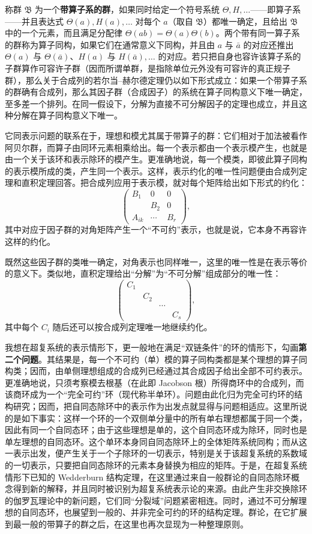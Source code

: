 \documentclass[11pt]{article}
\newcommand{\srcemph}[1]{\textbf{#1}}
\begin{document}
称群 $\mathfrak{B}$ 为一个\srcemph{带算子系的群}，如果同时给定一个符号系统 $\Theta,H,\ldots$——即算子系——并且表达式 $\Theta(a),H(a),\ldots$ 对每个 $a$（取自 $\mathfrak{B}$）都唯一确定，且给出 $\mathfrak{B}$ 中的一个元素，而且满足分配律 $\Theta(ab)=\Theta(a)\Theta(b)$。两个带有同一算子系的群称为算子同构，如果它们在通常意义下同构，并且由 $a$ 与 $\bar a$ 的对应还推出 $\Theta(a)$ 与 $\Theta(\bar a)$、$H(a)$ 与 $H(\bar a),\ldots$ 的对应。若只把自身也容许该算子系的子群算作可容许子群（因而所谓单群，是指除单位元外没有可容许的真正规子群），那么关于合成列的若尔当--赫尔德定理仍以如下形式成立：如果一个带算子系的群确有合成列，那么其因子群（合成因子）的系统在算子同构意义下唯一确定，至多差一个排列。在同一假设下，分解为直接不可分解因子的定理也成立，并且这种分解在算子同构意义下唯一。

它同表示问题的联系在于，理想和模尤其属于带算子的群：它们相对于加法被看作阿贝尔群，而算子由同环元素相乘给出。每一个表示都由一个表示模产生，也就是由一个关于该环和表示除环的模产生。更准确地说，每一个模类，即彼此算子同构的表示模所成的类，产生同一个表示。这样，表示约化的唯一性问题便由合成列定理和直积定理回答。把合成列应用于表示模，就对每个矩阵给出如下形式的约化：
\[
\begin{pmatrix}
B_1&0&0\\
&B_2&0\\
A_{ik}&\cdots&B_r
\end{pmatrix},
\]
其中对应于因子群的对角矩阵产生一个“不可约”表示，也就是说，它本身不再容许这样的约化。

既然这些因子群的类唯一确定，对角表示也同样唯一，这里的唯一性是在表示等价的意义下。类似地，直积定理给出“分解”为“不可分解”组成部分的唯一性：
\[
\begin{pmatrix}
C_1&&&\\
&C_2&&\\
&&\cdots&\\
&&&C_s
\end{pmatrix},
\]
其中每个 $C_i$ 随后还可以按合成列定理唯一地继续约化。

我想在超复系统的表示情形下，更一般地在满足“双链条件”的环的情形下，勾画\srcemph{第二个问题}。其结果是，每一个不可约（单）模的算子同构类都是某个理想的算子同构类；因而，由单侧理想组成的合成列已经通过其合成因子给出全部不可约表示。更准确地说，只须考察模去根基（在此即 Jacobson 根）所得商环中的合成列，而该商环成为一个“完全可约”环（现代称半单环）。问题由此化归为完全可约环的结构研究；因而，把自同态除环中的表示作为出发点就显得与问题相适应。这里所说的是如下事实：这样一个环的一个双侧单分量中的所有单右理想都属于同一个类，因此有同一个自同态环；由于这些理想是单的，这个自同态环成为除环，同时也是单左理想的自同态环。这个单环本身同自同态除环上的全体矩阵系统同构；而从这一表示出发，便产生关于一个子除环的一切表示，特别是关于该超复系统的系数域的一切表示，只要把自同态除环的元素本身替换为相应的矩阵。于是，在超复系统情形下已知的 Wedderburn 结构定理，在这里通过来自一般群论的自同态除环概念得到新的解释，并且同时被识别为超复系统表示论的来源。由此产生非交换除环的伽罗瓦理论中的新问题，它们同“分裂域”问题紧密相连。同时，通过不可分解理想的自同态环，也展望到一般的、并非完全可约的环的结构定理。群论，在它扩展到最一般的带算子的群之后，在这里也再次显现为一种整理原则。

\endgroup
\end{document}
